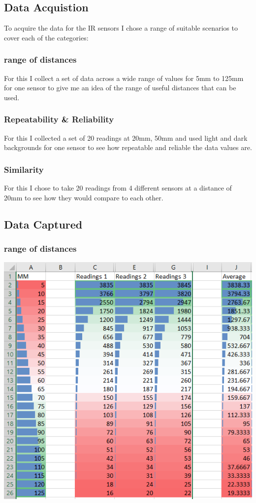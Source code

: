\documentclass[11pt,a4paper,titlepage]{article}
\begin{document}
\subsection{Data Acquistion}
	To acquire the data for the IR sensors I chose a range of suitable scenarios to cover each of the categories:
	\subsubsection{range of distances}
		For this I collect a set of data across a wide range of values for 5mm to 125mm for one sensor to give me an idea of the range of useful distances that can be used.
	\subsubsection{Repeatability \& Reliability}
		For this I collected a set of 20 readings at 20mm, 50mm and used light and dark backgrounds  for one sensor to see how repeatable and reliable the data values are.  
	\subsubsection{Similarity}
		For this I chose to take 20 readings from 4 different sensors at a distance of 20mm to see how they would compare to each other.
\subsection{Data Captured}
	\subsubsection{range of distances}
		\includegraphics[width=\textwidth,height=\textheight,keepaspectratio]{irRange}
\end{document}
